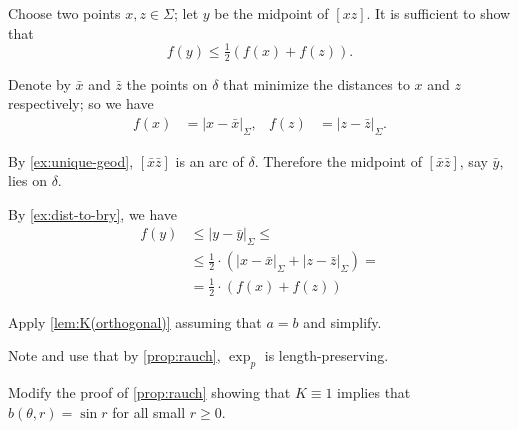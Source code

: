 Choose two points $x,z\in\Sigma$;
let $y$ be the midpoint of $[xz]$.
It is sufficient to show that 
\[f(y)\le \tfrac12(f(x)+f(z)).\]

Denote by $\bar x$ and $\bar z$ the points on $\delta$ that minimize the distances to $x$ and $z$ respectively;
so we have
\begin{align*}
f(x)
&=|x-\bar x|_\Sigma,
&
f(z)
&=|z-\bar z|_\Sigma.
\end{align*}

By \ref{ex:unique-geod}, $[\bar x\bar z]$ is an arc of $\delta$.
Therefore the midpoint of $[\bar x\bar z]$, say  $\bar y$, lies on $\delta$.

By \ref{ex:dist-to-bry}, we have 
\begin{align*}
f(y)&\le |y-\bar y|_\Sigma\le
\\
&\le\tfrac12\cdot(|x-\bar x|_\Sigma
+
|z-\bar z|_\Sigma)=
\\
&=\tfrac12\cdot(f(x)+f(z))
\end{align*}

 Apply \ref{lem:K(orthogonal)} assuming that $a=b$ and simplify.

 Note and use that by \ref{prop:rauch}, $\exp_p$ is length-preserving.

{

 Modify the proof of \ref{prop:rauch} showing that $K\equiv 1$ implies that $b(\theta,r)=\sin r$ for all small $r\ge 0$.

}

